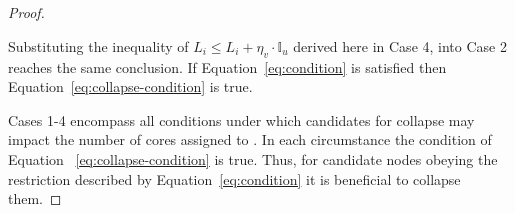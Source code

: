 \begin{theorem}
\begin{proof}
\begin{case}
      Substituting the inequality of
      ${\hat{L}_i \le L_i + \eta_v \cdot \mathbb{I}_u}$ derived here in
      Case 4, into Case 2 reaches the same conclusion. If
      Equation~\ref{eq:condition} is satisfied then
      Equation~\ref{eq:collapse-condition} is true.
    \end{case}

    
    Cases 1-4 encompass all conditions under which candidates for
    collapse may impact the number of cores assigned to . In
    each circumstance the condition of Equation
    ~\ref{eq:collapse-condition} is true. Thus, for candidate nodes
    obeying the restriction described by Equation~\ref{eq:condition}
    it is beneficial to collapse them.
  \end{proof}
\end{theorem}
